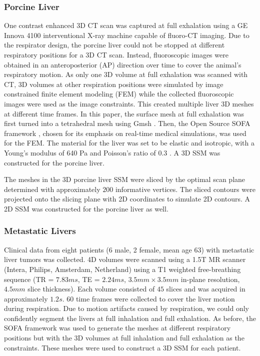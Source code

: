 \documentclass[review]{elsarticle}
\begin{document}
\subsubsection{Porcine Liver}
One contrast enhanced 3D CT scan was captured at full exhalation using a GE Innova 4100 interventional X-ray machine capable of fluoro-CT imaging. Due to the respirator design, the porcine liver could not be stopped at different respiratory positions for a 3D CT scan. Instead, fluoroscopic images were obtained in an anteroposterior (AP) direction over time to cover the animal's respiratory motion. As only one 3D volume at full exhalation was scanned with CT, 3D volumes at other respiration positions were simulated by image constrained finite element modeling (FEM) \citep{lerotic2009image} while the collected fluoroscopic images were used as the image constraints. This created multiple liver 3D meshes at different time frames. In this paper, the surface mesh at full exhalation was first turned into a tetrahedral mesh using Gmsh \citep{geuzaine2009gmsh}. Then, the Open Source SOFA framework \citep{allard2007sofa}, chosen for its emphasis on real-time medical simulations, was used for the FEM. The material for the liver was set to be elastic and isotropic, with a Young's modulus of 640 Pa and Poisson's ratio of 0.3 \citep{yeh2002elastic}. A 3D SSM was constructed for the porcine liver.

The meshes in the 3D porcine liver SSM were sliced by the optimal scan plane determined with approximately $200$ informative vertices. The sliced contours were projected onto the slicing plane with 2D coordinates to simulate 2D contours. A 2D SSM was constructed for the porcine liver as well.

\subsubsection{Metastatic Livers}
Clinical data from eight patients (6 male, 2 female, mean age 63) with metastatic liver tumors was collected. 4D volumes were scanned using a 1.5T MR scanner (Intera, Philips, Amsterdam, Netherland) using a T1 weighted free-breathing sequence (TR = $7.83 ms$, TE = $2.24 ms$, $3.5mm\times3.5mm$ in-plane resolution, $4.5mm$ slice thickness). Each volume consisted of $45$ slices and was acquired in approximately $1.2s$. $60$ time frames were collected to cover the liver motion during respiration. Due to motion artifacts caused by respiration, we could only confidently segment the livers at full inhalation and full exhalation. As before, the SOFA framework was used to generate the meshes at different respiratory positions but with the 3D volumes at full inhalation and full exhalation as the constraints. These meshes were used to construct a 3D SSM for each patient.
\end{document}

